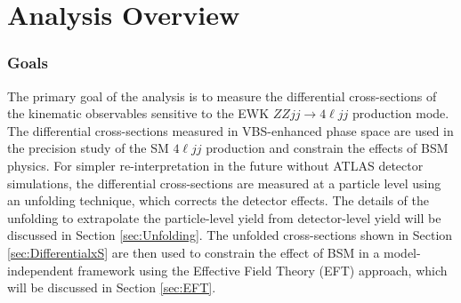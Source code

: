 \part {\LARGE{Analysis Overview}}
\label{sec:AnalysisOverview}

\section{Goals}
\label{sec:Analysis_Goals}

The primary goal of the analysis is to measure the differential cross-sections of the kinematic observables sensitive to the EWK $ZZjj \rightarrow 4\ell jj$ production mode. The differential cross-sections measured in VBS-enhanced phase space are used in the precision study of the SM $4\ell jj$ production and constrain the effects of BSM physics. For simpler re-interpretation in the future without ATLAS detector simulations, the differential cross-sections are measured at a particle level using an unfolding technique, which corrects the detector effects. The details of the unfolding to extrapolate the particle-level yield from detector-level yield will be discussed in Section \ref{sec:Unfolding}. The unfolded cross-sections shown in Section \ref{sec:DifferentialxS} are then used to constrain the effect of BSM in a model-independent framework using the Effective Field Theory (EFT) approach, which will be discussed in Section \ref{sec:EFT}. 
  

